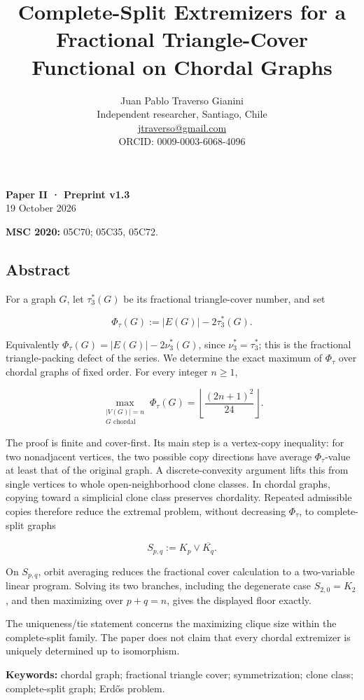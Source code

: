 \documentclass[english,11pt,a4paper]{article}
\title{Complete-Split Extremizers for a Fractional Triangle-Cover Functional on Chordal Graphs}
\author{Juan Pablo Traverso Gianini\\\small Independent researcher, Santiago, Chile\\\small \href{mailto:jtraverso@gmail.com}{jtraverso@gmail.com}\\\small ORCID: 0009-0003-6068-4096}
\date{}
\begin{document}
\raggedbottom
\maketitle
\textbf{Paper II · Preprint v1.3}\\
19 October 2026

\textbf{MSC 2020:} 05C70; 05C35, 05C72.

\subsection{Abstract}\label{abstract}

For a graph \(G\), let \(\tau_3^*(G)\) be its fractional triangle-cover
number, and set

\[
\Phi_\tau(G):=|E(G)|-2\tau_3^*(G).
\]

Equivalently \(\Phi_\tau(G)=|E(G)|-2\nu_3^*(G)\), since
\(\nu_3^*=\tau_3^*\); this is the fractional triangle-packing defect of
the series. We determine the exact maximum of \(\Phi_\tau\) over chordal
graphs of fixed order. For every integer \(n\ge1\),

\[
\boxed{
\max_{\substack{|V(G)|=n\\G\text{ chordal}}}
\Phi_\tau(G)
=
\left\lfloor\frac{(2n+1)^2}{24}\right\rfloor
}.
\]

The proof is finite and cover-first. Its main step is a vertex-copy
inequality: for two nonadjacent vertices, the two possible copy
directions have average \(\Phi_\tau\)-value at least that of the
original graph. A discrete-convexity argument lifts this from single
vertices to whole open-neighborhood clone classes. In chordal graphs,
copying toward a simplicial clone class preserves chordality. Repeated
admissible copies therefore reduce the extremal problem, without
decreasing \(\Phi_\tau\), to complete-split graphs

\[
S_{p,q}:=K_p\vee\overline{K_q}.
\]

On \(S_{p,q}\), orbit averaging reduces the fractional cover calculation
to a two-variable linear program. Solving its two branches, including
the degenerate case \(S_{2,0}=K_2\), and then maximizing over \(p+q=n\),
gives the displayed floor exactly.

The uniqueness/tie statement concerns the maximizing clique size within
the complete-split family. The paper does not claim that every chordal
extremizer is uniquely determined up to isomorphism.

\textbf{Keywords:} chordal graph; fractional triangle cover;
symmetrization; clone class; complete-split graph; Erdős problem.
\end{document}
